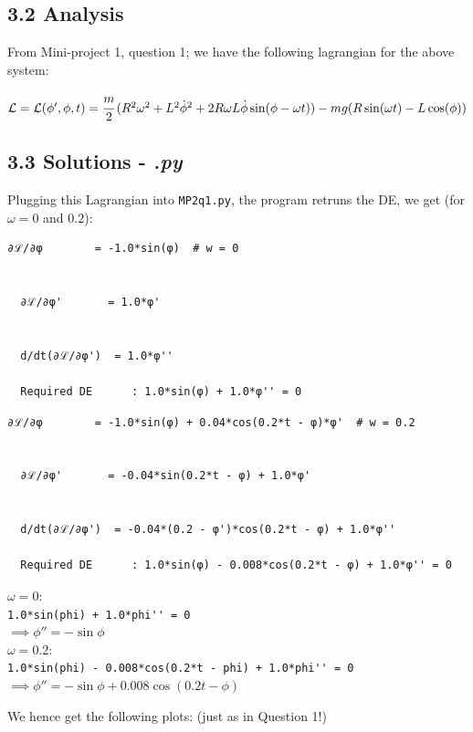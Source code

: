 \documentclass[hidelinks, 11pt]{article}
\newcommand{\Lagr}{\mathcal{L}}
\begin{document}
\subsection*{3.2 Analysis}

From Mini-project 1, question 1; we have the following lagrangian for the above system:

$\Lagr = \Lagr(\phi', \phi, t) = \cfrac{m}{2}\, (R^2 \omega^2 + L^2 \dot{\phi}^2 + 2 R \omega L \dot{\phi}\sin(\phi - \omega t)) - mg(R \sin(\omega t) - L \cos(\phi))$ 

\subsection*{3.3 Solutions - \emph{.py}}

Plugging this Lagrangian into \verb|MP2q1.py|, the program retruns the DE, we get (for $\omega = 0$ and $0.2$):

\begin{lstlisting}[language = html]
  ∂ℒ/∂φ        = -1.0*sin(φ)  # w = 0


  ∂ℒ/∂φ'       = 1.0*φ'
  
  
  d/dt(∂ℒ/∂φ')  = 1.0*φ''
  
  Required DE      : 1.0*sin(φ) + 1.0*φ'' = 0
\end{lstlisting} 

\begin{lstlisting}[language = html]
  ∂ℒ/∂φ        = -1.0*sin(φ) + 0.04*cos(0.2*t - φ)*φ'  # w = 0.2


  ∂ℒ/∂φ'       = -0.04*sin(0.2*t - φ) + 1.0*φ'
  
  
  d/dt(∂ℒ/∂φ')  = -0.04*(0.2 - φ')*cos(0.2*t - φ) + 1.0*φ''
  
  Required DE      : 1.0*sin(φ) - 0.008*cos(0.2*t - φ) + 1.0*φ'' = 0
\end{lstlisting} 

\noindent $\omega = 0$:\\
\verb|1.0*sin(phi) + 1.0*phi'' = 0| \\
$\implies \phi'' = -\sin{\phi}$
\\
\noindent $\omega = 0.2$:\\
\verb|1.0*sin(phi) - 0.008*cos(0.2*t - phi) + 1.0*phi'' = 0| \\
$\implies \phi'' = -\sin{\phi} + 0.008\cos{(0.2t - \phi)}$

We hence get the following plots: (just as in Question 1!)
\end{document}

